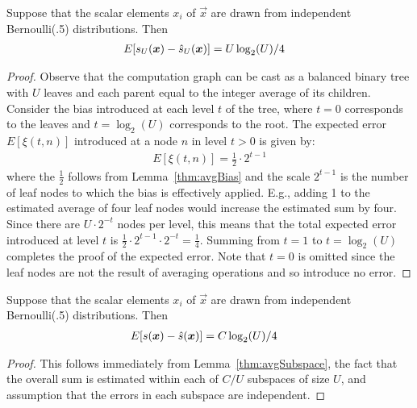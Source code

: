 \begin{lemma} \label{thm:avgSubspace}
Suppose that the scalar elements $x_i$ of $\vec{x}$ are drawn from independent Bernoulli(.5) distributions. Then
\begin{align}
    E[s_U(\bm{x}) - \hat{s}_U(\bm{x})] &= U \log_2(U) / 4
\end{align}
\end{lemma}
\begin{proof}
Observe that the computation graph can be cast as a balanced binary tree with $U$ leaves and each parent equal to the integer average of its children. Consider the bias introduced at each level $t$ of the tree, where $t=0$ corresponds to the leaves and $t = \log_2(U)$ corresponds to the root. The expected error $E[\xi(t, n)]$ introduced at a node $n$ in level $t > 0$ is given by:
\begin{align}
    E[\xi(t, n)] = \frac{1}{2} \cdot 2^{t - 1}
\end{align}
where the $\frac{1}{2}$ follows from Lemma~\ref{thm:avgBias} and the scale $2^{t - 1}$ is the number of leaf nodes to which the bias is effectively applied. E.g., adding 1 to the estimated average of four leaf nodes would increase the estimated sum by four. Since there are $U \cdot 2^{-t}$ nodes per level, this means that the total expected error introduced at level $t$ is $\frac{1}{2} \cdot 2^{t - 1} \cdot 2^{-t} = \frac{1}{4}$. Summing from $t = 1$ to $t = \log_2(U)$ completes the proof of the expected error. Note that $t=0$ is omitted since the leaf nodes are not the result of averaging operations and so introduce no error.

\end{proof}


\begin{theorem} \label{thm:overallBias}
Suppose that the scalar elements $x_i$ of $\vec{x}$ are drawn from independent Bernoulli(.5) distributions. Then
\begin{align}
    E[s(\bm{x}) - \hat{s}(\bm{x})] &= C \log_2(U) / 4
\end{align}
\end{theorem}
\begin{proof}
This follows immediately from Lemma~\ref{thm:avgSubspace}, the fact that the overall sum is estimated within each of $C / U$ subspaces of size $U$, and assumption that the errors in each subspace are independent.
\end{proof}

